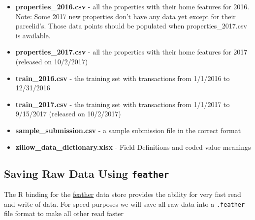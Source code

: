 \documentclass[]{book}
\theoremstyle{definition}
\theoremstyle{definition}
\theoremstyle{definition}
\theoremstyle{remark}
\begin{document}
\begin{itemize}
\item
  \textbf{properties\_2016.csv} - all the properties with their home
  features for 2016. Note: Some 2017 new properties don't have any data
  yet except for their parcelid's. Those data points should be populated
  when properties\_2017.csv is available.
\item
  \textbf{properties\_2017.csv} - all the properties with their home
  features for 2017 (released on 10/2/2017)
\item
  \textbf{train\_2016.csv} - the training set with transactions from
  1/1/2016 to 12/31/2016
\item
  \textbf{train\_2017.csv} - the training set with transactions from
  1/1/2017 to 9/15/2017 (released on 10/2/2017)
\item
  \textbf{sample\_submission.csv} - a sample submission file in the
  correct format
\item
  \textbf{zillow\_data\_dictionary.xlsx} - Field Definitions and coded
  value meanings
\end{itemize}

\subsection{\texorpdfstring{Saving Raw Data Using
\texttt{feather}}{Saving Raw Data Using feather}}\label{saving-raw-data-using-feather}

The R binding for the \href{https://github.com/wesm/feather}{feather}
data store provides the ability for very fast read and write of data.
For speed purposes we will save all raw data into a \texttt{.feather}
file format to make all other read faster
\end{document}

